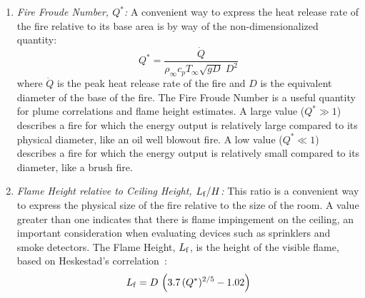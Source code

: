 \documentclass[graybox]{svmult}
\begin{document}
\begin{enumerate}
\item {\em Fire Froude Number, $Q^*$:}
A convenient way to express the heat release rate of the fire relative to its base area is by way of the non-dimensionalized quantity:
\begin{equation}
 Q^* = \frac{\dot{Q}}{\rho_\infty c_p T_\infty \sqrt{gD} \; D^2} \label{qstar}
\end{equation}
where $\dot{Q}$ is the peak heat release rate of the fire and $D$ is the equivalent diameter of the base of the fire.
The Fire Froude Number is a useful quantity for plume correlations and flame height estimates. A large value ($Q^* \gg 1$) describes a fire for which the energy output is relatively large compared to its physical diameter, like an oil well blowout fire.  A low value ($Q^* \ll 1$) describes a fire for which the energy output is relatively small compared to its diameter, like a brush fire.

\item {\em Flame Height relative to Ceiling Height, $L_{\rm f}/H$:}
This ratio is a convenient way to express the physical size of the fire relative to the size of the room. A value greater than
one indicates that there is flame impingement on the ceiling, an important consideration when evaluating devices such as sprinklers and smoke detectors.
The Flame Height, $L_{\rm f}$, is the height of the visible flame, based on Heskestad's correlation~\cite{Heskestad:FSJ1983}:
\begin{equation}
   L_{\rm f} = D \, \left( 3.7 \, (Q^*)^{2/5} - 1.02 \right) \label{Heskestad_Flame_Height}
\end{equation}


\end{enumerate}
\end{document}
